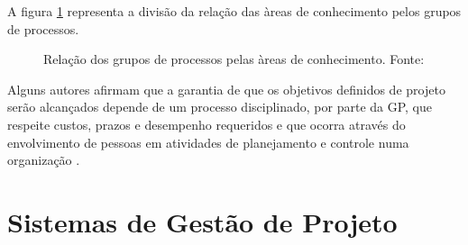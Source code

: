 A figura \ref{processos_areas_pmbok} representa a divisão da relação das àreas de conhecimento pelos grupos de processos.

\begin{figure}[ht]
  \centering
  \caption{Relação dos grupos de processos pelas àreas de conhecimento. Fonte: \cite{pmiguide2014}}
  \label{processos_areas_pmbok}
\end{figure}

Alguns autores afirmam que a garantia de que os objetivos definidos de projeto serão alcançados depende de um processo disciplinado, por parte da GP, que respeite custos, prazos e desempenho requeridos e que ocorra através do envolvimento de pessoas em atividades de planejamento e controle numa organização \cite{dinsmore2009ama, meredith2011project}.


\section{Sistemas de Gestão de Projeto}

